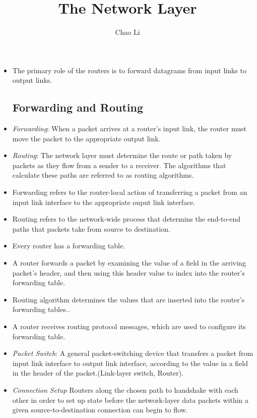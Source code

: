 \message{ !name(chapter4.tex)}\documentclass{article}
\title{The Network Layer}
\author{Chao Li}
\begin{document}
\begin{itemize}
\item The primary role of the routers is to forward datagrams from
  input links to output links.
\subsection{Forwarding and Routing}
\item \emph{Forwarding}: When a packet arrives at a router's input
  link, the router must move the packet to the appropriate output
  link.
\item \emph{Routing}: The network layer must determine the route or
  path taken by packets as they flow from a sender to a receiver. The
  algorithms that calculate these paths are referred to as routing
  algorithms.
\item Forwarding refers to the router-local action of transferring a
  packet from an input link interface to the appropriate ouput link
  interface.
\item Routing refers to the network-wide process that determins the
  end-to-end paths that packets take from source to destination.
\item Every router has a forwarding table.
\item A router forwards a packet by examining the value of a field in
  the arriving packet's header, and then using this header value to
  index into the router's forwarding table.
\item Routing algorithm determines the values that are inserted into
  the router's forwarding tables..
\item A router receives routing protocol messages, which are used to
  configure its forwarding table.
\item \emph{Packet Switch}: A general packet-switching device that
  transfers a packet from input link interface to output link
  interface, according to the value in a field in the header of the
  packet.(Link-layer switch, Router).
\item \emph{Connection Setup} Routers along the chosen path to
  handshake with each other in order to set up state before the
  network-layer data packets within a given source-to-destination
  connection can begin to flow.

\end{itemize}
\end{document}
